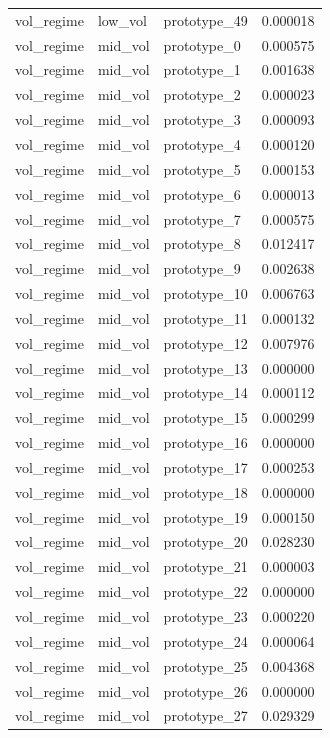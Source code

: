\begin{tabular}{lllr}
vol\_regime & low\_vol & prototype\_49 & 0.000018 \\
vol\_regime & mid\_vol & prototype\_0 & 0.000575 \\
vol\_regime & mid\_vol & prototype\_1 & 0.001638 \\
vol\_regime & mid\_vol & prototype\_2 & 0.000023 \\
vol\_regime & mid\_vol & prototype\_3 & 0.000093 \\
vol\_regime & mid\_vol & prototype\_4 & 0.000120 \\
vol\_regime & mid\_vol & prototype\_5 & 0.000153 \\
vol\_regime & mid\_vol & prototype\_6 & 0.000013 \\
vol\_regime & mid\_vol & prototype\_7 & 0.000575 \\
vol\_regime & mid\_vol & prototype\_8 & 0.012417 \\
vol\_regime & mid\_vol & prototype\_9 & 0.002638 \\
vol\_regime & mid\_vol & prototype\_10 & 0.006763 \\
vol\_regime & mid\_vol & prototype\_11 & 0.000132 \\
vol\_regime & mid\_vol & prototype\_12 & 0.007976 \\
vol\_regime & mid\_vol & prototype\_13 & 0.000000 \\
vol\_regime & mid\_vol & prototype\_14 & 0.000112 \\
vol\_regime & mid\_vol & prototype\_15 & 0.000299 \\
vol\_regime & mid\_vol & prototype\_16 & 0.000000 \\
vol\_regime & mid\_vol & prototype\_17 & 0.000253 \\
vol\_regime & mid\_vol & prototype\_18 & 0.000000 \\
vol\_regime & mid\_vol & prototype\_19 & 0.000150 \\
vol\_regime & mid\_vol & prototype\_20 & 0.028230 \\
vol\_regime & mid\_vol & prototype\_21 & 0.000003 \\
vol\_regime & mid\_vol & prototype\_22 & 0.000000 \\
vol\_regime & mid\_vol & prototype\_23 & 0.000220 \\
vol\_regime & mid\_vol & prototype\_24 & 0.000064 \\
vol\_regime & mid\_vol & prototype\_25 & 0.004368 \\
vol\_regime & mid\_vol & prototype\_26 & 0.000000 \\
vol\_regime & mid\_vol & prototype\_27 & 0.029329 \\

\end{tabular}
